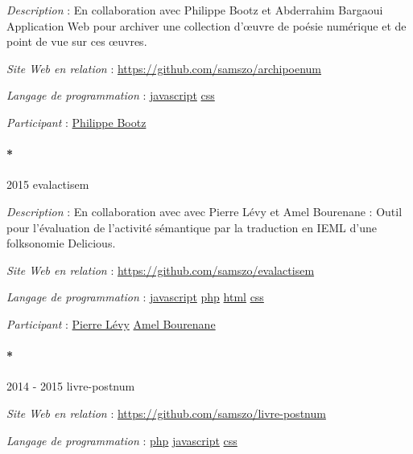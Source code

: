 \documentclass[
  a4paper,
  DIV=11,
  numbers=noendperiod]{scrreprt}
\let\oldparagraph\paragraph
\renewcommand{\paragraph}[1]{\oldparagraph{#1}\mbox{}}
\begin{document}
\emph{Description} : En collaboration avec Philippe Bootz et Abderrahim
Bargaoui Application Web pour archiver une collection d'œuvre de poésie
numérique et de point de vue sur ces œuvres.

\emph{Site Web en relation} :
\url{https://github.com/samszo/archipoenum}

\emph{Langage de programmation} :
\href{http://localhost/samszo/omk/s/fiches/item/89711}{javascript}
\href{http://localhost/samszo/omk/s/fiches/item/102418}{css}

\emph{Participant} :
\href{http://localhost/samszo/omk/s/fiches/item/61224}{Philippe Bootz}

\paragraph*{2015 evalactisem}\label{sec-item299748}

\emph{Description} : En collaboration avec avec Pierre Lévy et Amel
Bourenane : Outil pour l'évaluation de l'activité sémantique par la
traduction en IEML d'une folksonomie Delicious.

\emph{Site Web en relation} :
\url{https://github.com/samszo/evalactisem}

\emph{Langage de programmation} :
\href{http://localhost/samszo/omk/s/fiches/item/89711}{javascript}
\href{http://localhost/samszo/omk/s/fiches/item/108369}{php}
\href{http://localhost/samszo/omk/s/fiches/item/96621}{html}
\href{http://localhost/samszo/omk/s/fiches/item/102418}{css}

\emph{Participant} :
\href{http://localhost/samszo/omk/s/fiches/item/61132}{Pierre Lévy}
\href{http://localhost/samszo/omk/s/fiches/item/299782}{Amel Bourenane}

\paragraph*{2014 - 2015 livre-postnum}\label{sec-item301777}

\emph{Site Web en relation} :
\url{https://github.com/samszo/livre-postnum}

\emph{Langage de programmation} :
\href{http://localhost/samszo/omk/s/fiches/item/108369}{php}
\href{http://localhost/samszo/omk/s/fiches/item/89711}{javascript}
\href{http://localhost/samszo/omk/s/fiches/item/102418}{css}
\end{document}
